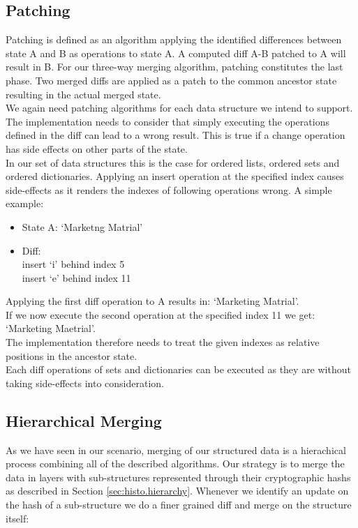 \subsection{Patching}
\label{sec:histo.merging.patching}

Patching is defined as an algorithm applying the identified differences between state A and B as operations to state A.
A computed diff A-B patched to A will result in B.
For our three-way merging algorithm, patching constitutes the last phase. 
Two merged diffs are applied as a patch to the common ancestor state resulting in the actual merged state.\\
We again need patching algorithms for each data structure we intend to support.
The implementation needs to consider that simply executing the operations defined in the diff can lead to a wrong result.
This is true if a change operation has side effects on other parts of the state.\\
In our set of data structures this is the case for ordered lists, ordered sets and ordered dictionaries.
Applying an insert operation at the specified index causes side-effects as it renders the indexes of following operations wrong.
A simple example:

\begin{itemize}
\item State A: `Marketng Matrial'
\item Diff:\\
insert `i' behind index 5\\
insert `e' behind index 11
\end{itemize}

Applying the first diff operation to A results in: `Marketing Matrial'.\\
If we now execute the second operation at the specified index 11 we get: `Marketing Maetrial'.\\
The implementation therefore needs to treat the given indexes as relative positions in the ancestor state.\\
Each diff operations of sets and dictionaries can be executed as they are without taking side-effects into consideration.

\subsection{Hierarchical Merging}
As we have seen in our scenario, merging of our structured data is a hierachical process combining all of the described algorithms.
Our strategy is to merge the data in layers with sub-structures represented through their cryptographic hashs as described in Section \ref{sec:histo.hierarchy}.
Whenever we identify an update on the hash of a sub-structure we do a finer grained diff and merge on the structure itself:

